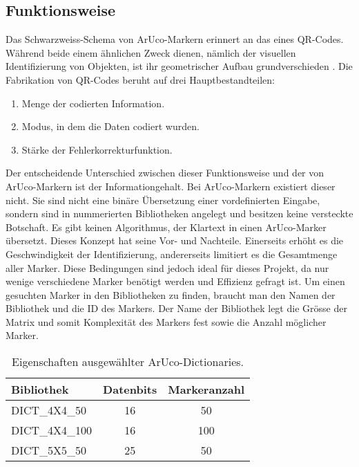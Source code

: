 \subsection{Funktionsweise}
Das Schwarzweiss-Schema von ArUco-Markern erinnert an das eines QR-Codes. Während beide einem ähnlichen Zweck dienen, nämlich der visuellen Identifizierung von Objekten, ist ihr geometrischer Aufbau grundverschieden \cite{ten:qrcode}.
Die Fabrikation von QR-Codes beruht auf drei Hauptbestandteilen:

\begin{enumerate}
    \item Menge der codierten Information.
    \item Modus, in dem die Daten codiert wurden.
    \item Stärke der Fehlerkorrekturfunktion.
\end{enumerate}

Der entscheidende Unterschied zwischen dieser Funktionsweise und der von ArUco-Markern ist der Informationgehalt. Bei ArUco-Markern existiert dieser nicht. Sie sind nicht eine binäre Übersetzung einer vordefinierten Eingabe, sondern sind in nummerierten Bibliotheken angelegt und besitzen keine versteckte Botschaft. Es gibt keinen Algorithmus, der Klartext in einen ArUco-Marker übersetzt. Dieses Konzept hat seine Vor- und Nachteile. Einerseits erhöht es die Geschwindigkeit der Identifizierung, andererseits limitiert es die Gesamtmenge aller Marker. Diese Bedingungen sind jedoch ideal für dieses Projekt, da nur wenige verschiedene Marker benötigt werden und Effizienz gefragt ist. 
Um einen gesuchten Marker in den Bibliotheken zu finden, braucht man den Namen der Bibliothek und die ID des Markers. Der Name der Bibliothek legt die Grösse der Matrix und somit Komplexität des Markers fest sowie die Anzahl möglicher Marker.

\begin{table}[H]
    \centering
    \begin{tabular}{lcc}
        \toprule
        \textbf{Bibliothek} & \textbf{Datenbits} & \textbf{Markeranzahl} \\
        \midrule
        DICT\_4X4\_50 & 16 & 50 \\
        DICT\_4X4\_100 & 16 & 100 \\
        DICT\_5X5\_50 & 25 & 50 \\
        \bottomrule
    \end{tabular}
    \caption{Eigenschaften ausgewählter ArUco-Dictionaries.}
        \label{tab:aruco_dicts}
\end{table}


